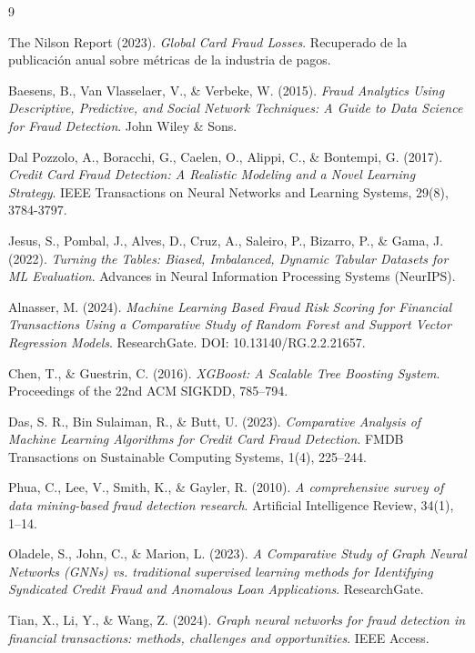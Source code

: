 \documentclass[12pt,a4paper]{report}
\begin{document}
\begin{thebibliography}{9}

The Nilson Report (2023). \textit{Global Card Fraud Losses}. Recuperado de la publicación anual sobre métricas de la industria de pagos.

Baesens, B., Van Vlasselaer, V., \& Verbeke, W. (2015). \textit{Fraud Analytics Using Descriptive, Predictive, and Social Network Techniques: A Guide to Data Science for Fraud Detection}. John Wiley \& Sons.

Dal Pozzolo, A., Boracchi, G., Caelen, O., Alippi, C., \& Bontempi, G. (2017). \textit{Credit Card Fraud Detection: A Realistic Modeling and a Novel Learning Strategy}. IEEE Transactions on Neural Networks and Learning Systems, 29(8), 3784-3797.

Jesus, S., Pombal, J., Alves, D., Cruz, A., Saleiro, P., Bizarro, P., \& Gama, J. (2022). \textit{Turning the Tables: Biased, Imbalanced, Dynamic Tabular Datasets for ML Evaluation}. Advances in Neural Information Processing Systems (NeurIPS).

Alnasser, M. (2024). \textit{Machine Learning Based Fraud Risk Scoring for Financial Transactions Using a Comparative Study of Random Forest and Support Vector Regression Models}. ResearchGate. DOI: 10.13140/RG.2.2.21657.

Chen, T., \& Guestrin, C. (2016). \textit{XGBoost: A Scalable Tree Boosting System}. Proceedings of the 22nd ACM SIGKDD, 785–794.

Das, S. R., Bin Sulaiman, R., \& Butt, U. (2023). \textit{Comparative Analysis of Machine Learning Algorithms for Credit Card Fraud Detection}. FMDB Transactions on Sustainable Computing Systems, 1(4), 225–244.

Phua, C., Lee, V., Smith, K., \& Gayler, R. (2010). \textit{A comprehensive survey of data mining-based fraud detection research}. Artificial Intelligence Review, 34(1), 1–14.

Oladele, S., John, C., \& Marion, L. (2023). \textit{A Comparative Study of Graph Neural Networks (GNNs) vs. traditional supervised learning methods for Identifying Syndicated Credit Fraud and Anomalous Loan Applications}. ResearchGate.

Tian, X., Li, Y., \& Wang, Z. (2024). \textit{Graph neural networks for fraud detection in financial transactions: methods, challenges and opportunities}. IEEE Access.


\end{thebibliography}
\end{document}
